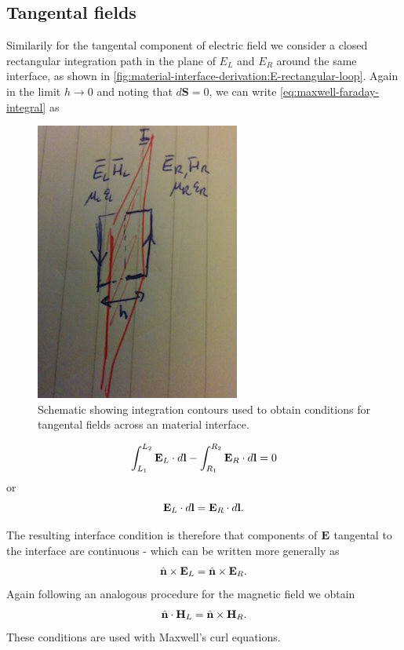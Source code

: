 \subsection{Tangental fields}

Similarily for the tangental component of electric field we consider a closed rectangular integration path in the plane of $E_L$ and $E_R$ around the same interface, as shown in \eqref{fig:material-interface-derivation:E-rectangular-loop}. Again in the limit $h \to 0$ and noting that $d\mathbf{S} = 0$, we can write \eqref{eq:maxwell-faraday-integral} as
\begin{figure}[htbp!]
\begin{center}
    \includegraphics[scale=0.9]{Figures/Chapters/PhysicalProblem/interfaceContour}
\end{center}
\caption{Schematic showing integration contours used to obtain conditions for tangental fields across an material interface.}
\label{fig:material-interface-derivation:E-rectangular-loop}
\end{figure}
\begin{equation}
\label{eq:material-interfaces-tangentalcondition-E}
\int_{L_1}^{L_2} \mathbf{E}_L \cdot d\mathbf{l} - \int_{R_1}^{R_2} \mathbf{E}_R \cdot d \mathbf{l} = 0
\end{equation}
or
$$
\mathbf{E}_L \cdot d\mathbf{l} = \mathbf{E}_R \cdot d \mathbf{l} .
$$

The resulting interface condition is therefore that components of $\mathbf{E}$ tangental to the interface are continuous - which can be written more generally as
$$
\hat{\mathbf{n}} \times \mathbf{E}_L = \hat{\mathbf{n}} \times \mathbf{E}_R .
$$
Again following an analogous procedure for the magnetic field we obtain
$$
\hat{\mathbf{n}} \cdot \mathbf{H}_L = \hat{\mathbf{n}} \times \mathbf{H}_R .
$$
These conditions are used with Maxwell's curl equations.

